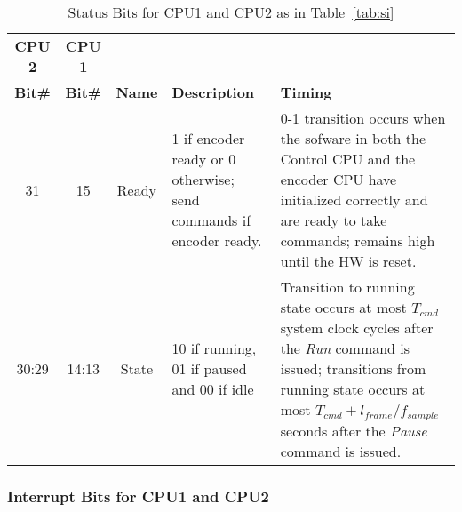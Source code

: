 \documentclass{rep}
\theoremstyle{plain}
\begin{document}
\begin{table}[H]
  \begin{center}
    \begin{tabular}{|c|c|c|p{4cm}|p{5cm}|}
      \hline
      \rowcolor{iob-green}
      \textbf{CPU 2}  & \textbf{CPU 1}  & \cellcolor{iob-green} & \cellcolor{iob-green}  & \cellcolor{iob-green}\\ 
      \rowcolor{iob-green}
      \textbf{Bit\#}  & \textbf{Bit\#} & \multirow{-2}{*}{\cellcolor{iob-green} \textbf{Name}} & \multirow{-2}{*}{\cellcolor{iob-green}\textbf{Description}} & \multirow{-2}{*}{\cellcolor{iob-green}\textbf{Timing}} \\
      \hline
      \hline

      31 & 15 & Ready & 1 if encoder ready or 0 otherwise; send commands if
      encoder ready. & 0-1 transition occurs when the sofware in both the
      Control CPU and the encoder CPU have initialized correctly and are ready
      to take commands; remains high until the HW is reset.\\ \hline

      \rowcolor{iob-blue} 30:29 & 14:13 & State & 10 if running, 01 if paused
      and 00 if idle & Transition to running state occurs at most $T_{cmd}$
      system clock cycles after the \textit{Run} command is issued; transitions
      from running state occurs at most $T_{cmd} + l_{frame} / f_{sample}$
      seconds after the \textit{Pause} command is issued.\\ \hline

    \end{tabular}
    \caption{Status Bits for CPU1 and CPU2 as in Table~\ref{tab:si}}
    \label{tab:status}
  \end{center}
\end{table}
\clearpage


\subsubsection{Interrupt Bits for CPU1 and CPU2}
\end{document}
